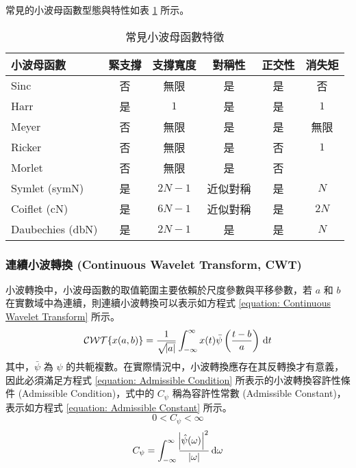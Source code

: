 %
常見的小波母函數型態與特性如表 \ref{table: Wavelet Mother Function} 所示。
%
\begin{table}[htp]
  \centering
  \caption[常見小波母函數特徵]{常見小波母函數特徵}
  \begin{tabular*}{0.85\textwidth}{lccccc}
    \toprule
    \textbf{小波母函數} & \textbf{緊支撐} & \textbf{支撐寬度} & \textbf{對稱性} & \textbf{正交性} & \textbf{消失矩} \\
    \midrule
    Sinc & 否 & 無限 & 是 & 是 & 否 \\
    Harr & 是 & $1$ & 是 & 是 & $1$ \\
    Meyer & 否 & 無限 & 是 & 是 & 無限 \\
    Ricker & 否 & 無限 & 是 & 否 & $1$ \\
    Morlet & 否 & 無限 & 是 & 否 & \\
    Symlet (symN) & 是 & $2N-1$ & 近似對稱 & 是 & $N$ \\
    Coiflet (cN) & 是 & $6N-1$ & 近似對稱 & 是 & $2N$ \\
    Daubechies (dbN) & 是 & $2N-1$ & 是 & 是 & $N$ \\
    \bottomrule
  \end{tabular*}
  \label{table: Wavelet Mother Function}
\end{table}
%
\subsubsection{連續小波轉換 (Continuous Wavelet Transform, CWT)}

小波轉換中，小波母函數的取值範圍主要依賴於尺度參數與平移參數，若 $a$ 和 $b$ 在實數域中為連續，則連續小波轉換可以表示如方程式 \eqref{equation: Continuous Wavelet Transform} 所示。
%
\begin{equation}\label{equation: Continuous Wavelet Transform}
  \mathcal{CWT}\{ x(a, b) \} = \frac{1}{\sqrt{\abs{a}}} \int_{-\infty}^{\infty} x(t) \bar{\psi} \left( \frac{t - b}{a} \right) \, \mathop{}\!\mathrm{d} t
\end{equation}
%
其中，$\bar{\psi}$ 為 $\psi$ 的共軛複數。在實際情況中，小波轉換應存在其反轉換才有意義，因此必須滿足方程式 \eqref{equation: Admissible Condition} 所表示的小波轉換容許性條件 (Admissible Condition)，式中的 $C_{\psi}$ 稱為容許性常數 (Admissible Constant)，表示如方程式 \eqref{equation: Admissible Constant} 所示。
%
\begin{equation}\label{equation: Admissible Condition}
  0 < C_{\psi} < \infty
\end{equation}
%
\begin{equation}\label{equation: Admissible Constant}
  C_{\psi} = \int_{-\infty}^{\infty} \frac{\abs{\hat{\psi} (\omega)}^2}{|\omega|} \mathop{}\!\mathrm{d} \omega
\end{equation}
%
